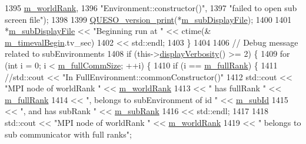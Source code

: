 \begin{DoxyCode}
{1395                         \hyperlink{class_q_u_e_s_o_1_1_base_environment_a464cab923ada0e14c6e3a4000c2ea385}{m\_worldRank},
1396                         \textcolor{stringliteral}{"Environment::constructor()"},
1397                         \textcolor{stringliteral}{"failed to open sub screen file"});
1398 
1399     \hyperlink{namespace_q_u_e_s_o_ae2e4805bfcc226b2ceb17c8a8dbb1297}{QUESO\_version\_print}(*\hyperlink{class_q_u_e_s_o_1_1_base_environment_a52b4275aa8ee85994dd304d9fe95c9c5}{m\_subDisplayFile});
1400 
1401     *\hyperlink{class_q_u_e_s_o_1_1_base_environment_a52b4275aa8ee85994dd304d9fe95c9c5}{m\_subDisplayFile} << \textcolor{stringliteral}{"Beginning run at "} << ctime(&
      \hyperlink{class_q_u_e_s_o_1_1_base_environment_a7b2842a4eb78bcae522cf4f9a5634279}{m\_timevalBegin}.tv\_sec)
1402                       << std::endl;
1403   \}
1404 
1406   \textcolor{comment}{// Debug message related to subEnvironments}
1408 \textcolor{comment}{}  \textcolor{keywordflow}{if} (this->\hyperlink{class_q_u_e_s_o_1_1_base_environment_a1fe5f244fc0316a0ab3e37463f108b96}{displayVerbosity}() >= 2) \{
1409     \textcolor{keywordflow}{for} (\textcolor{keywordtype}{int} i = 0; i < \hyperlink{class_q_u_e_s_o_1_1_base_environment_ad5be3e52676db90de1321bc94233c15d}{m\_fullCommSize}; ++i) \{
1410       \textcolor{keywordflow}{if} (i == \hyperlink{class_q_u_e_s_o_1_1_base_environment_a0bfa53f6bdaec0a6aa3dc00ee2c0101f}{m\_fullRank}) \{
1411         \textcolor{comment}{//std::cout << "In FullEnvironment::commonConstructor()"}
1412         std::cout << \textcolor{stringliteral}{"MPI node of worldRank "}             << \hyperlink{class_q_u_e_s_o_1_1_base_environment_a464cab923ada0e14c6e3a4000c2ea385}{m\_worldRank}
1413                   << \textcolor{stringliteral}{" has fullRank "}                     << \hyperlink{class_q_u_e_s_o_1_1_base_environment_a0bfa53f6bdaec0a6aa3dc00ee2c0101f}{m\_fullRank}
1414                   << \textcolor{stringliteral}{", belongs to subEnvironment of id "} << \hyperlink{class_q_u_e_s_o_1_1_base_environment_a2aea4a26ea39e72300f7c32594c26012}{m\_subId}
1415                   << \textcolor{stringliteral}{", and has subRank "}                 << \hyperlink{class_q_u_e_s_o_1_1_base_environment_acecae0962d56bae97b6476c7514b428f}{m\_subRank}
1416                   << std::endl;
1417 
1418         std::cout << \textcolor{stringliteral}{"MPI node of worldRank "} << \hyperlink{class_q_u_e_s_o_1_1_base_environment_a464cab923ada0e14c6e3a4000c2ea385}{m\_worldRank}
1419                   << \textcolor{stringliteral}{" belongs to sub communicator with full ranks"};
}
\end{DoxyCode}
